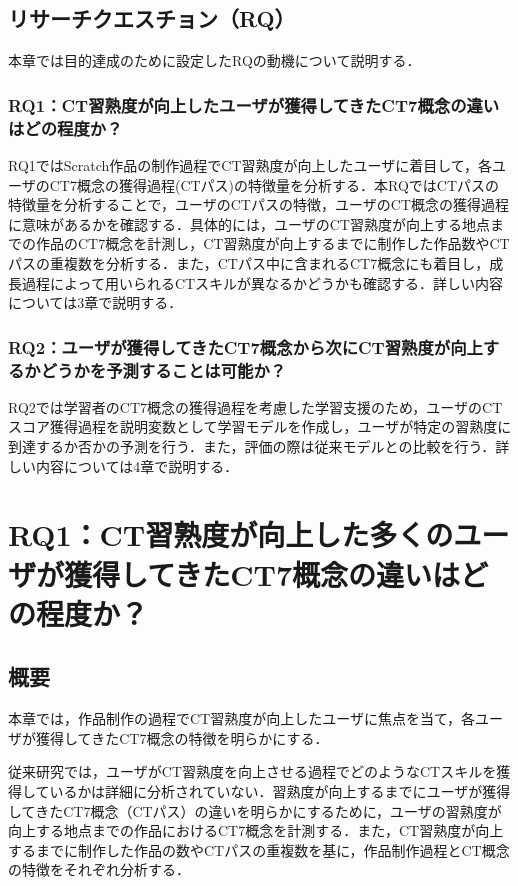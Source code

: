 \documentclass[11pt,dvipdfmx]{jreport}
\newcommand{\todo}[1]{\colorbox{yellow}{{\bf TODO}:}{\color{red} {\textbf{[#1]}}}}
\begin{document}


\section{リサーチクエスチョン（RQ）}
本章では目的達成のために設定したRQの動機について説明する．
\subsection{RQ1：CT習熟度が向上したユーザが獲得してきたCT7概念の違いはどの程度か？}
RQ1ではScratch作品の制作過程でCT習熟度が向上したユーザに着目して，各ユーザのCT7概念の獲得過程(CTパス)の特徴量を分析する．本RQではCTパスの特徴量を分析することで，ユーザのCTパスの特徴，ユーザのCT概念の獲得過程に意味があるかを確認する．具体的には，ユーザのCT習熟度が向上する地点までの作品のCT7概念を計測し，CT習熟度が向上するまでに制作した作品数やCTパスの重複数を分析する．また，CTパス中に含まれるCT7概念にも着目し，成長過程によって用いられるCTスキルが異なるかどうかも確認する．詳しい内容については3章で説明する．
\subsection{RQ2：ユーザが獲得してきたCT7概念から次にCT習熟度が向上するかどうかを予測することは可能か？}

RQ2では学習者のCT7概念の獲得過程を考慮した学習支援のため，ユーザのCTスコア獲得過程を説明変数として学習モデルを作成し，ユーザが特定の習熟度に到達するか否かの予測を行う．また，評価の際は従来モデルとの比較を行う．詳しい内容については4章で説明する．


\chapter{RQ1：CT習熟度が向上した多くのユーザが獲得してきたCT7概念の違いはどの程度か？}\label{sec:chapter_3}
\section{概要}
本章では，作品制作の過程でCT習熟度が向上したユーザに焦点を当て，各ユーザが獲得してきたCT7概念の特徴を明らかにする．

従来研究では，ユーザがCT習熟度を向上させる過程でどのようなCTスキルを獲得しているかは詳細に分析されていない．習熟度が向上するまでにユーザが獲得してきたCT7概念（CTパス）の違いを明らかにするために，ユーザの習熟度が向上する地点までの作品におけるCT7概念を計測する．また，CT習熟度が向上するまでに制作した作品の数やCTパスの重複数を基に，作品制作過程とCT概念の特徴をそれぞれ分析する．
\end{document}
